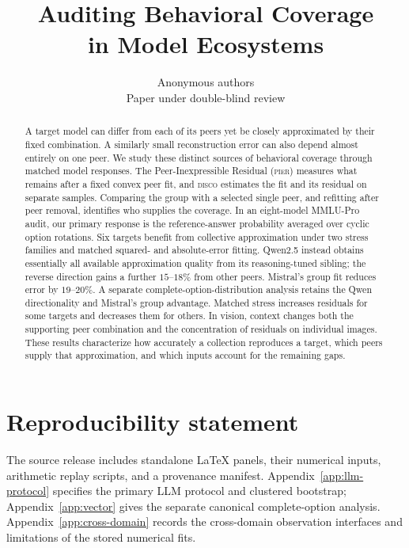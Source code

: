 \documentclass{article}
\title{Auditing Behavioral Coverage\\in Model Ecosystems}
\author{Anonymous authors\\Paper under double-blind review}
\newcommand{\PIER}{\textsc{pier}\xspace}
\newcommand{\DISCO}{\textsc{disco}\xspace}
\begin{document}
\maketitle

\begin{abstract}
A target model can differ from each of its peers yet be closely approximated by their fixed combination. A similarly small reconstruction error can also depend almost entirely on one peer. We study these distinct sources of behavioral coverage through matched model responses. The Peer-Inexpressible Residual (\PIER) measures what remains after a fixed convex peer fit, and \DISCO estimates the fit and its residual on separate samples. Comparing the group with a selected single peer, and refitting after peer removal, identifies who supplies the coverage. In an eight-model MMLU-Pro audit, our primary response is the reference-answer probability averaged over cyclic option rotations. Six targets benefit from collective approximation under two stress families and matched squared- and absolute-error fitting. Qwen2.5 instead obtains essentially all available approximation quality from its reasoning-tuned sibling; the reverse direction gains a further $15$--$18\%$ from other peers. Mistral's group fit reduces error by $19$--$20\%$. A separate complete-option-distribution analysis retains the Qwen directionality and Mistral's group advantage. Matched stress increases residuals for some targets and decreases them for others. In vision, context changes both the supporting peer combination and the concentration of residuals on individual images. These results characterize how accurately a collection reproduces a target, which peers supply that approximation, and which inputs account for the remaining gaps.
\end{abstract}







\FloatBarrier

\FloatBarrier



\clearpage



\section*{Reproducibility statement}
The source release includes standalone LaTeX panels, their numerical inputs, arithmetic replay scripts, and a provenance manifest. Appendix~\ref{app:llm-protocol} specifies the primary LLM protocol and clustered bootstrap; Appendix~\ref{app:vector} gives the separate canonical complete-option analysis. Appendix~\ref{app:cross-domain} records the cross-domain observation interfaces and limitations of the stored numerical fits.
\end{document}
